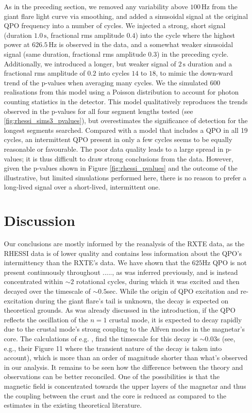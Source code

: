 \documentclass{emulateapj}
\begin{document}
As in the preceding section, we removed any variability above $100 \,\mathrm{Hz}$ from the \rhessi giant flare light curve via smoothing, and added a sinusoidal signal at the original QPO frequency into a number of cycles.
We injected a strong, short signal (duration $1.0 \,\mathrm{s}$, fractional rms amplitude $0.4$) into the cycle where the highest power at $626.5 \,\mathrm{Hz}$ is observed in the \rhessi data, and a somewhat weaker sinusoidal signal (same duration, fractional rms amplitude $0.3$) in the preceding cycle.
Additionally, we introduced a longer, but weaker signal of $2\,\mathrm{s}$ duration and a fractional rms amplitude of $0.2$ into cycles $14$ to $18$, to mimic the down-ward trend of the p-values when averaging many cycles. We the simulated $600$ realisations from this model using a Poisson distribution to account for photon counting statistics in the detector.
This model qualitatively reproduces the trends observed in the p-values for all four segment lengths tested (see \ref{fig:rhessi_sims3_pvalues}), but overestimates the significance of detection for the longest segments searched. Compared with a model that includes a QPO in all 19 cycles, an intermittent QPO present in only a few cycles seems to be equally reasonable or favourable. The poor data quality leads to a large spread in p-values; it is thus difficult to draw strong conclusions from the data. However, given the p-values shown in Figure \ref{fig:rhessi_pvalues} and the outcome of the illustrative, but limited simulations performed here, there is no reason to prefer a long-lived signal over a short-lived, intermittent one.


\section{Discussion}
\label{sec:discussion}

Our conclusions are mostly informed by the reanalysis of the RXTE data, as the RHESSI data is of lower quality and contains less information about the QPO's intermittency than the RXTE's data. We have shown
 that the $625$Hz QPO is not present continuously throughout ....., as was inferred previously, and is instead concentrated within $\sim 2$ rotational cycles, during which it was excited and then decayed over the timescale
of $\sim 0.5$sec. While the origin of QPO excitation and re-excitation during the giant flare's tail is unknown, the
decay is expected on theoretical grounds. As was already discussed in the introduction, if the QPO reflects the oscillation of the $n=1$ crustal mode, it is expected to decay rapidly due to the crustal mode's strong coupling to the Alfven modes
in the magnetar's core. The calculations of e.g. \citet{vanHoven12}, find the timescale for this decay is $\sim 0.03$s (see, e.g., their Figure 11 where the transient nature of the decay is taken into account), which is more than an order of magnitude shorter than what's observed in our analysis. It remains to be seen how the difference between the theory and observations can be better reconciled. One of the possibilities is that the magnetic field is concentrated towards the upper layers of the magnetar and thus the coupling between the
crust and the core is reduced as compared to the estimates in the existing theoretical literature.



\end{document}
